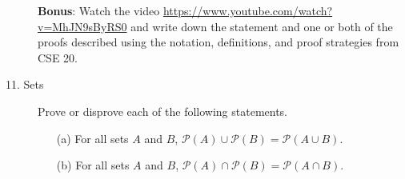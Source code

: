 \documentclass[12pt, oneside]{article}
\newif \ifsolution
\begin{document}
\begin{description}
\begin{enumerate}
  \end{enumerate}
  
  {\bf Bonus}: Watch the video \url{https://www.youtube.com/watch?v=MhJN9sByRS0} and write
  down the statement and one or both of the proofs described using the notation, definitions, and 
  proof strategies from CSE 20. 

  \item[11. Sets]  Prove or disprove each of the following statements.
  \begin{enumerate}
  \item[(a)]  For all sets $A$ and $B$, $\mathcal{P}(A) \cup \mathcal{P}(B) = \mathcal{P}(A \cup B)$.
  
  \ifsolution
  \soltwo{
  False.  A counterexample would be $A = \{1\}, B = \{2\}$.  Then 
  \[
  \mathcal{P}(A) \cup \mathcal{P}(B) = \{ \emptyset, \{1\} \} \cup \{ \emptyset , \{2\} \} = 
  \{ \emptyset, \{1\}, \{2\} \}
  \]
  but
  \[
  \mathcal{P}(A \cup B) = \mathcal{P}(\{1,2\}) = \{ \emptyset, \{1\}, \{2\}, \{1,2\} \}.
  \]
  These sets are not equal because they disagree about membership of $\{1,2\}$.
  }
  \else{}
  \fi
  
  \item[(b)] For all sets $A$ and $B$, $\mathcal{P}(A) \cap \mathcal{P}(B) = \mathcal{P}(A \cap B)$.
  
  \ifsolution
  \soltwo{
  True.  Proof: let $A, B$ be arbitrary sets.  We WTS that 
  $\mathcal{P}(A) \cap \mathcal{P}(B) \subseteq \mathcal{P}(A \cap B)$
  and $\mathcal{P}(A \cap B) \subseteq \mathcal{P}(A) \cap \mathcal{P}(B)$.
  \begin{itemize}
  \item[(c)] For the first subset inclusion, consider arbitrary $X \in \mathcal{P}(A) \cap \mathcal{P}(B)$.
  By definition of intersection, $X\in \mathcal{P}(A)$ and $X \in \mathcal{P}(B)$.
  By definition of power set, this means that $X \subseteq A$ and $X \subseteq B$.
  WTS that $X \subseteq A \cap B$: let $x \in X$.  Since $X \subseteq A$, $x \in A$.
  Since $X \subseteq B$, $x \in B$.  Thus, $x \in A$ and $x \in B$ so $x \in A \cap B$.
  Since $x$ was arbitrary, $\forall x ( x \in X \to x \in A \cap B)$ so $X \subseteq A \cap B$.
  Therefore, by definition of power set $X \in \mathcal{P}(A \cap B)$, as required.
  
  \item[(d)] For the second subset inclusion, consider arbitrary $X \in \mathcal{P}(A \cap B)$.  
  By definition of power set, $X \subseteq (A \cap B)$.  WTS that $X \subseteq A$ and 
  $X \subseteq B$.  Let $x \in X$.  Then by definition of subsets, $x \in A \cap B$. 
  By definition of intersection, $x \in A$ and $x \in B$.  Thus $X \subseteq A$ and 
  $X \subseteq B$ and so by definition of power set, $X \in \mathcal{P}(A)$
  and $X \in \mathcal{P}(B)$.  By definition of intersection, $X \in \mathcal{P}(A) \cap 
  \mathcal{P}(B)$, 
  as required.
  \end{itemize}
  }
  \else{}
  \fi
  

\end{enumerate}
\end{description}
\end{document}
